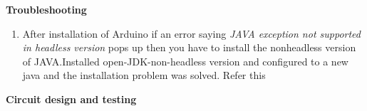 \documentclass[16pt]{article}
\begin{document}
\vspace{0.5cm}

{\Large{\textbf{Troubleshooting}}}

\begin{enumerate}

\item
  After installation of Arduino if an error saying \emph{JAVA exception
  not supported in headless version} pops up then you have to install
  the nonheadless version of JAVA.Installed open-JDK-non-headless
  version and configured to a new java and the installation problem was
  solved. Refer this
\end{enumerate}


\vspace{3.5cm}

{\LARGE{\textbf{Circuit design and testing}}}
\end{document}
